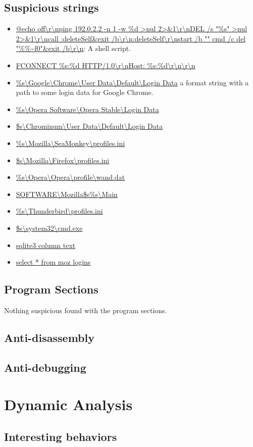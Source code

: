 \documentclass{article}
\begin{document}
    \subsection{Suspicious strings}
    \begin{itemize}
        \item \url{@echo off\r\nping 192.0.2.2 -n 1 -w %d >nul 2>&1\r\nDEL /s "%s" >nul 2>&1\r\ncall :deleteSelf&exit /b\r\n:deleteSelf\r\nstart /b "" cmd /c del "%%~f0"&exit /b\r\n}: A shell script.
        \item \url{FCONNECT %s:%d HTTP/1.0\r\nHost: %s:%d\r\n\r\n}
        \item \url{%s\Google\Chrome\User Data\Default\Login Data} a format string with a path to some login data for Google Chrome.
        \item \url{%s\Opera Software\Opera Stable\Login Data}
        \item \url{$s\Chrominum\User Data\Default\Login Data}
        \item \url{%s\Mozilla\SeaMonkey\profiles.ini}
        \item \url{$s\Mozilla\Firefox\profiles.ini}
        \item \url{%s\Opera\Opera\profile\wand.dat}
        \item \url{SOFTWARE\Mozilla\$s\%s\Main}
        \item \url{%s\Thunderbird\profiles.ini}
        \item \url{$s\system32\cmd.exe}
        \item \url{sqlite3 column text}
        \item \url{select * from moz logins}
    \end{itemize}
    \subsection{Program Sections}
    Nothing suspicious found with the program sections.
    \subsection{Anti-disassembly}
    \subsection{Anti-debugging}
    \pagebreak
    \section{Dynamic Analysis}
    \subsection{Interesting behaviors}
\end{document}
